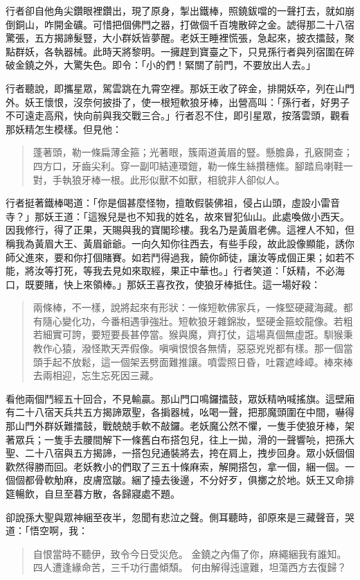 行者卻自他角尖鑽眼裡鑽出，現了原身，掣出鐵棒，照鐃鈸噹的一聲打去，就如崩倒銅山，咋開金礦。可惜把個佛門之器，打做個千百塊散碎之金。諕得那二十八宿驚張，五方揭諦髮豎，大小群妖皆夢醒。老妖王睡裡慌張，急起來，披衣擂鼓，聚點群妖，各執器械。此時天將黎明。一擁趕到寶臺之下，只見孫行者與列宿圍在碎破金鐃之外，大驚失色。即令：「小的們！緊關了前門，不要放出人去。」

行者聽說，即攜星眾，駕雲跳在九霄空裡。那妖王收了碎金，排開妖卒，列在山門外。妖王懷恨，沒奈何披掛了，使一根短軟狼牙棒，出營高叫：「孫行者，好男子不可遠走高飛，快向前與我交戰三合。」行者忍不住，即引星眾，按落雲頭，觀看那妖精怎生模樣。但見他：
\begin{quote}
蓬著頭，勒一條扁薄金箍；光著眼，簇兩道黃眉的豎。懸膽鼻，孔竅開查；四方口，牙齒尖利。穿一副叩結連環鎧，勒一條生絲攢穗絛。腳踏烏喇鞋一對，手執狼牙棒一根。此形似獸不如獸，相貌非人卻似人。
\end{quote}

行者挺著鐵棒喝道：「你是個甚麼怪物，擅敢假裝佛祖，侵占山頭，虛設小雷音寺？」那妖王道：「這猴兒是也不知我的姓名，故來冒犯仙山。此處喚做小西天。因我修行，得了正果，天賜與我的寶閣珍樓。我名乃是黃眉老佛。這裡人不知，但稱我為黃眉大王、黃眉爺爺。一向久知你往西去，有些手段，故此設像顯能，誘你師父進來，要和你打個賭賽。如若鬥得過我，饒你師徒，讓汝等成個正果；如若不能，將汝等打死，等我去見如來取經，果正中華也。」行者笑道：「妖精，不必海口，既要賭，快上來領棒。」那妖王喜孜孜，使狼牙棒抵住。這一場好殺：
\begin{quote}
兩條棒，不一樣，說將起來有形狀：一條短軟佛家兵，一條堅硬藏海藏。都有隨心變化功，今番相遇爭強壯。短軟狼牙雜錦妝，堅硬金箍蛟龍像。若粗若細實可誇，要短要長甚停當。猴與魔，齊打仗，這場真個無虛誑。馴猴秉教作心猿，潑怪欺天弄假像。嗔嗔恨恨各無情，惡惡兇兇都有樣。那一個當頭手起不放鬆，這一個架丟劈面難推讓。噴雲照日昏，吐霧遮峰嶂。棒來棒去兩相迎，忘生忘死因三藏。
\end{quote}

看他兩個鬥經五十回合，不見輸贏。那山門口鳴鑼擂鼓，眾妖精吶喊搖旗。這壁廂有二十八宿天兵共五方揭諦眾聖，各掮器械，吆喝一聲，把那魔頭圍在中間，嚇得那山門外群妖難擂鼓，戰兢兢手軟不敲鑼。老妖魔公然不懼，一隻手使狼牙棒，架著眾兵；一隻手去腰間解下一條舊白布搭包兒，往上一拋，滑的一聲響喨，把孫大聖、二十八宿與五方揭諦，一搭包兒通裝將去，挎在肩上，拽步回身。眾小妖個個歡然得勝而回。老妖教小的們取了三五十條麻索，解開搭包，拿一個，綑一個。一個個都骨軟觔麻，皮膚窊皺。綑了擡去後邊，不分好歹，俱擲之於地。妖王又命排筵暢飲，自旦至暮方散，各歸寢處不題。

卻說孫大聖與眾神綑至夜半，忽聞有悲泣之聲。側耳聽時，卻原來是三藏聲音，哭道：「悟空啊，我：
\begin{quote}
自恨當時不聽伊，致令今日受災危。
金鐃之內傷了你，麻繩綑我有誰知。
四人遭逢緣命苦，三千功行盡傾頹。
何由解得迍邅難，坦蕩西方去復歸？
\end{quote}


